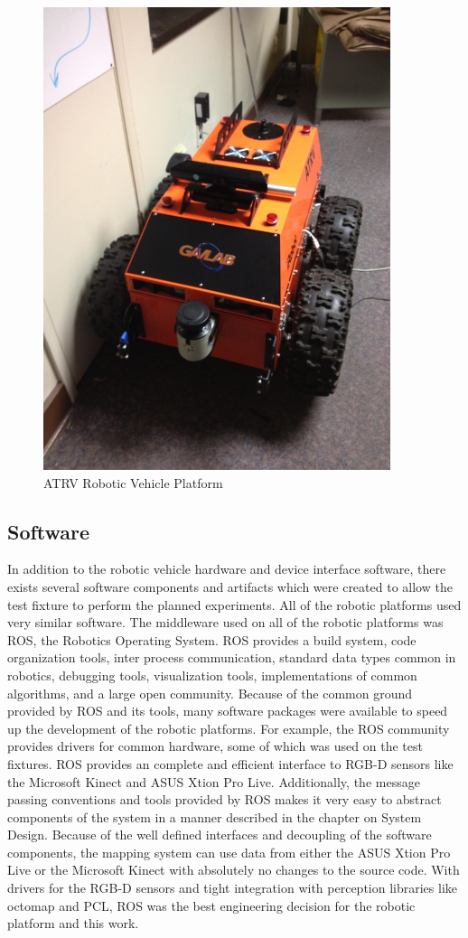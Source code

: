 \documentclass[12pt]{report}
\begin{document}
\begin{figure}[ht]
  \centering
  \includegraphics[width=4in,keepaspectratio]{atrv.jpeg}
  \caption{ATRV Robotic Vehicle Platform}
  \label{fig:atrv}
\end{figure}

\subsection{Software}
In addition to the robotic vehicle hardware and device interface software, there exists several software components and artifacts which were created to allow the test fixture to perform the planned experiments.  All of the robotic platforms used very similar software.  The middleware used on all of the robotic platforms was ROS, the Robotics Operating System\cite{quigley2009ros}.  ROS provides a build system, code organization tools, inter process communication, standard data types common in robotics, debugging tools, visualization tools, implementations of common algorithms, and a large open community.  Because of the common ground provided by ROS and its tools, many software packages were available to speed up the development of the robotic platforms.  For example, the ROS community provides drivers for common hardware, some of which was used on the test fixtures.  ROS provides an complete and efficient interface to RGB-D sensors like the Microsoft Kinect and ASUS Xtion Pro Live.  Additionally, the message passing conventions and tools provided by ROS makes it very easy to abstract components of the system in a manner described in the chapter on System Design.  Because of the well defined interfaces and decoupling of the software components, the mapping system can use data from either the ASUS Xtion Pro Live or the Microsoft Kinect with absolutely no changes to the source code.  With drivers for the RGB-D sensors and tight integration with perception libraries like octomap and PCL, ROS was the best engineering decision for the robotic platform and this work.
\end{document}
